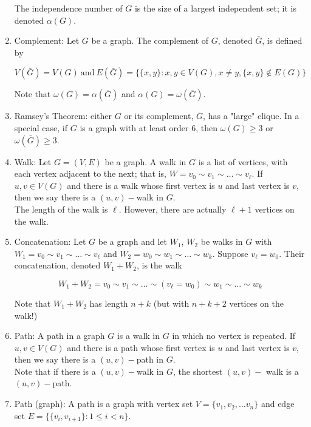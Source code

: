 \documentclass{article}
\begin{document}
\begin{enumerate}
		The independence number of $G$ is the size of a largest independent set;
		it is denoted $\alpha (G)$.
		
		\item Complement: Let $G$ be a graph.
		The complement of $G$, denoted $\bar G$, is defined by
		
		\[V(\bar G)=V(G)\: \text{and}\: E(\bar G)=\{\{x,y\}: x,y \in V(G), x\neq y, \{x,y\}\not\in E(G)\}\]
		
		Note that $\omega(G)=\alpha(\bar G)$ and $\alpha(G)=\omega(\bar G)$.
		
		\item Ramsey's Theorem: either $G$ or its complement, $\bar G$, has a "large" clique.
		In a special case, if $G$ is a graph with at least order $6$, then $\omega(G)\geq 3$ or $\omega(\bar G)\geq 3$.
		
		\item Walk: Let $G=(V,E)$ be a graph.
		A walk in $G$ is a list of vertices, with each vertex adjacent to the next;
		that is, $W=v_0\sim v_1\sim \dots \sim v_\ell$.
		If $u,v\in V(G)$ and there is a walk whose first vertex is $u$ and last vertex is $v$, then we say there is a $(u,v)-$walk in $G$.\\
		
		The length of the walk is $\ell$.
		However, there are actually $\ell +1$ vertices on the walk.
		
		\item Concatenation: Let $G$ be a graph and let $W_1$, $W_2$ be walks in $G$ with $W_1=v_0\sim v_1\sim \dots\sim v_\ell$ and $W_2=w_0\sim w_1\sim \dots \sim w_k$.
		Suppose $v_\ell=w_0$.
		Their concatenation, denoted $W_1+W_2$, is the walk
		
		\[W_1+W_2=v_0\sim v_1\sim \dots \sim(v_\ell=w_0)\sim w_1\sim \dots \sim w_k\]
		
		Note that $W_1+W_2$ has length $n+k$ (but with $n+k+2$ vertices on the walk!)
		
		\item Path: A path in a graph $G$ is a walk in $G$ in which no vertex is repeated.
		If $u,v\in V(G)$ and there is a path whose first vertex is $u$ and last vertex is $v$, then we say there is a $(u,v)-$path in $G$. \\
		
		Note that if there is a $(u,v)-$walk in $G$, the shortest $(u,v)-$ walk is a $(u,v)-$path.
		
		\item Path (graph): A path is a graph with vertex set $V=\{v_1,v_2,\dots v_n\}$ and edge set $E=\{\{v_i,v_{i+1}\}:1\leq i<n\}$.\\
		

\end{enumerate}
\end{document}
